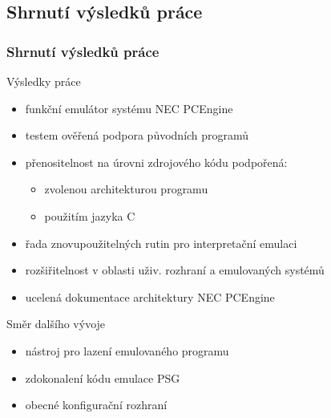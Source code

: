 \documentclass[10pt]{beamer}
\begin{document}
\subsection{Shrnutí výsledků práce}
\begin{frame}
\frametitle{Shrnutí výsledků práce}
\begin{block}{Výsledky práce}
\begin{itemize}
	\item funkční emulátor systému NEC PCEngine
	\item testem ověřená podpora původních programů
	\item přenositelnost na úrovni zdrojového kódu podpořená:
	\begin{itemize}
		\item zvolenou architekturou programu
		\item použitím jazyka C
	\end{itemize}
	\item řada znovupoužitelných rutin pro interpretační emulaci
	\item rozšiřitelnost v oblasti uživ. rozhraní a emulovaných systémů
	\item ucelená dokumentace architektury NEC PCEngine
\end{itemize}
\end{block}
\begin{block}{Směr dalšího vývoje}
\begin{itemize}
	\item nástroj pro lazení emulovaného programu
	\item zdokonalení kódu emulace PSG
	\item obecné konfigurační rozhraní
\end{itemize}
\end{block}

\end{frame}
\end{document}

